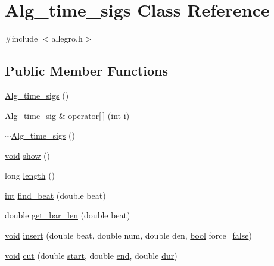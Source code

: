 \hypertarget{class_alg__time__sigs}{}\section{Alg\+\_\+time\+\_\+sigs Class Reference}
\label{class_alg__time__sigs}


{\ttfamily \#include $<$allegro.\+h$>$}

\subsection*{Public Member Functions}
\begin{DoxyCompactItemize}
\item 
\hyperlink{class_alg__time__sigs_af351d17ab80546124d7ddadb52f54295}{Alg\+\_\+time\+\_\+sigs} ()
\item 
\hyperlink{class_alg__time__sig}{Alg\+\_\+time\+\_\+sig} \& \hyperlink{class_alg__time__sigs_a4423619bec9d47074dcfdaa668ce7f3e}{operator\mbox{[}$\,$\mbox{]}} (\hyperlink{xmltok_8h_a5a0d4a5641ce434f1d23533f2b2e6653}{int} \hyperlink{checksum_8c_ab80e330a3bc9e38c1297fe17381e92b4}{i})
\item 
\hyperlink{class_alg__time__sigs_a4caee7e639a8af474a9a0a0146d7f08c}{$\sim$\+Alg\+\_\+time\+\_\+sigs} ()
\item 
\hyperlink{sound_8c_ae35f5844602719cf66324f4de2a658b3}{void} \hyperlink{class_alg__time__sigs_aa3e8b659fc60788dcbb0bc11ffbfd56f}{show} ()
\item 
long \hyperlink{class_alg__time__sigs_ab4caa20f4b1dc6f3c9d72d30a72ea1fa}{length} ()
\item 
\hyperlink{xmltok_8h_a5a0d4a5641ce434f1d23533f2b2e6653}{int} \hyperlink{class_alg__time__sigs_a8451b3c33e6c0a4011017250610f60ae}{find\+\_\+beat} (double beat)
\item 
double \hyperlink{class_alg__time__sigs_aa2d2e3115979237ad2134629215227c2}{get\+\_\+bar\+\_\+len} (double beat)
\item 
\hyperlink{sound_8c_ae35f5844602719cf66324f4de2a658b3}{void} \hyperlink{class_alg__time__sigs_aacdaea1e42ba2443773c30bf45bc5748}{insert} (double beat, double num, double den, \hyperlink{mac_2config_2i386_2lib-src_2libsoxr_2soxr-config_8h_abb452686968e48b67397da5f97445f5b}{bool} force=\hyperlink{mac_2config_2i386_2lib-src_2libsoxr_2soxr-config_8h_a65e9886d74aaee76545e83dd09011727}{false})
\item 
\hyperlink{sound_8c_ae35f5844602719cf66324f4de2a658b3}{void} \hyperlink{class_alg__time__sigs_ae71e54ae22798287d218d5c16291b1a6}{cut} (double \hyperlink{seqread_8c_ac503262ae470564980711da4f78b1181}{start}, double \hyperlink{convtest_8m_afb358f48b1646c750fb9da6c6585be2b}{end}, double \hyperlink{seqread_8c_a3c79b5a9ee81c3835b8de9b0d900d2de}{dur})

\end{DoxyCompactItemize}
